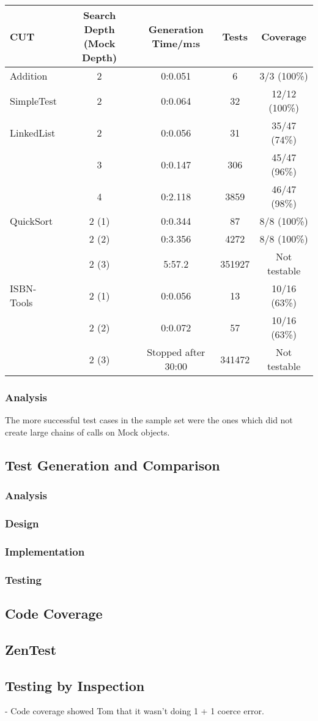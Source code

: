     \begin{tabular}{|l|cccc|}
\hline
\textbf{CUT} & \textbf{Search Depth (Mock Depth)} & \textbf{Generation Time/m:s} & \textbf{Tests} & \textbf{Coverage} \\
\hline
Addition & 2 & 0:0.051 & 6 & 3/3 (100\%) \\
\hline
SimpleTest & 2 & 0:0.064 & 32 & 12/12 (100\%) \\
\hline
LinkedList & 2 & 0:0.056 & 31 & 35/47 (74\%) \\
& 3 & 0:0.147 & 306 & 45/47 (96\%) \\
& 4 & 0:2.118 & 3859 & 46/47 (98\%)\\
\hline
QuickSort & 2 (1) & 0:0.344 & 87 & 8/8 (100\%) \\
& 2 (2) & 0:3.356 & 4272 & 8/8 (100\%) \\
& 2 (3) & 5:57.2 & 351927 & Not testable\\
\hline
ISBN-Tools & 2 (1) & 0:0.056 & 13 & 10/16 (63\%) \\
& 2 (2) & 0:0.072 & 57 & 10/16 (63\%) \\
& 2 (3) & Stopped after 30:00 & 341472 & Not testable \\
\hline
\end{tabular}

\subsubsection{Analysis}
  The more successful test cases in the sample set were the ones which did not create large chains of calls on Mock objects.

  \subsection{Test Generation and Comparison}
    \subsubsection{Analysis}
    \subsubsection{Design}
    \subsubsection{Implementation}
    \subsubsection{Testing}
  \subsection{Code Coverage}
  \subsection{ZenTest}
  \subsection{Testing by Inspection}
  - Code coverage showed Tom that it wasn't doing 1 + 1 coerce error.

